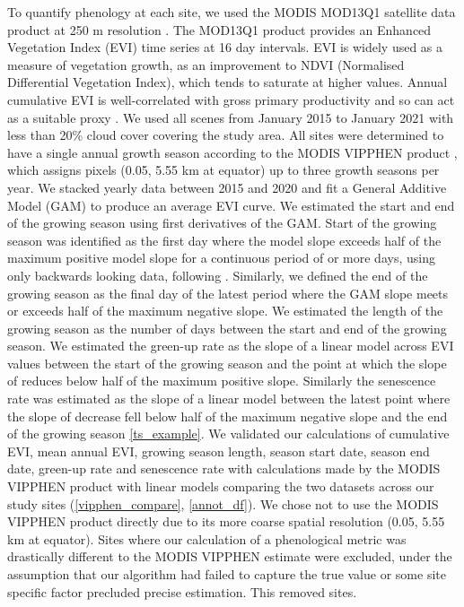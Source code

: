 \documentclass[11pt,a4paper]{article}
\begin{document}
To quantify phenology at each site, we used the MODIS MOD13Q1 satellite data product at 250 m resolution \citep{MOD13Q1}. The MOD13Q1 product provides an Enhanced Vegetation Index (EVI) time series at 16 day intervals. EVI is widely used as a measure of vegetation growth, as an improvement to NDVI (Normalised Differential Vegetation Index), which tends to saturate at higher values. Annual cumulative EVI is well-correlated with gross primary productivity and so can act as a suitable proxy \citep{}. We used all scenes from January 2015 to January 2021 with less than 20\% cloud cover covering the study area. All sites were determined to have a single annual growth season according to the MODIS VIPPHEN product \citep{}, which assigns pixels (0.05\textdegree, 5.55 km at equator) up to three growth seasons per year. We stacked yearly data between 2015 and 2020 and fit a General Additive Model (GAM) to produce an average EVI curve. We estimated the start and end of the growing season using first derivatives of the GAM. Start of the growing season was identified as the first day where the model slope exceeds half of the maximum positive model slope for a continuous period of \modisWin{} or more days, using only backwards looking data, following \citet{White2009}. Similarly, we defined the end of the growing season as the final day of the latest \trmmWin{} period where the GAM slope meets or exceeds half of the maximum negative slope. We estimated the length of the growing season as the number of days between the start and end of the growing season. We estimated the green-up rate as the slope of a linear model across EVI values between the start of the growing season and the point at which the slope of reduces below half of the maximum positive slope. Similarly the senescence rate was estimated as the slope of a linear model between the latest point where the slope of decrease fell below half of the maximum negative slope and the end of the growing season \autoref{ts_example}. We validated our calculations of cumulative EVI, mean annual EVI, growing season length, season start date, season end date, green-up rate and senescence rate with calculations made by the MODIS VIPPHEN product with linear models comparing the two datasets across our study sites (\autoref{vipphen_compare}, \autoref{annot_df}). We chose not to use the MODIS VIPPHEN product directly due to its more coarse spatial resolution (0.05\textdegree, 5.55 km at equator). Sites where our calculation of a phenological metric was drastically different to the MODIS VIPPHEN estimate were excluded, under the assumption that our algorithm had failed to capture the true value or some site specific factor precluded precise estimation. This removed \vipphenOutlier{} sites. 
\end{document}
